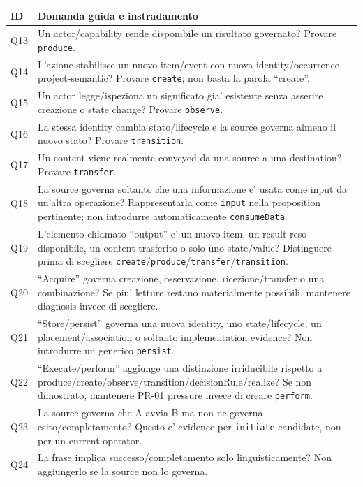\documentclass[11pt,a4paper]{article}
\begin{document}
\begin{longtable}{L{17mm}L{122mm}}
\toprule
\textbf{ID} & \textbf{Domanda guida e instradamento} \\
\midrule\endhead
Q13 & Un actor/capability rende disponibile un risultato governato? Provare \texttt{produce}. \\
Q14 & L'azione stabilisce un nuovo item/event con nuova identity/occurrence project-semantic? Provare \texttt{create}; non basta la parola ``create''. \\
Q15 & Un actor legge/ispeziona un significato gia' esistente senza asserire creazione o state change? Provare \texttt{observe}. \\
Q16 & La stessa identity cambia stato/lifecycle e la source governa almeno il nuovo stato? Provare \texttt{transition}. \\
Q17 & Un content viene realmente conveyed da una source a una destination? Provare \texttt{transfer}. \\
Q18 & La source governa soltanto che una informazione e' usata come input da un'altra operazione? Rappresentarla come \texttt{input} nella proposition pertinente; non introdurre automaticamente \texttt{consumeData}. \\
Q19 & L'elemento chiamato ``output'' e' un nuovo item, un result reso disponibile, un content trasferito o solo uno state/value? Distinguere prima di scegliere \texttt{create}/\texttt{produce}/\texttt{transfer}/\texttt{transition}. \\
Q20 & ``Acquire'' governa creazione, osservazione, ricezione/transfer o una combinazione? Se piu' letture restano materialmente possibili, mantenere diagnosis invece di scegliere. \\
Q21 & ``Store/persist'' governa una nuova identity, uno state/lifecycle, un placement/association o soltanto implementation evidence? Non introdurre un generico \texttt{persist}. \\
Q22 & ``Execute/perform'' aggiunge una distinzione irriducibile rispetto a produce/create/observe/transition/decisionRule/realize? Se non dimostrato, mantenere PR-01 pressure invece di creare \texttt{perform}. \\
Q23 & La source governa che A avvia B ma non ne governa esito/completamento? Questo e' evidence per \texttt{initiate} candidate, non per un current operator. \\
Q24 & La frase implica successo/completamento solo linguisticamente? Non aggiungerlo se la source non lo governa. \\
\bottomrule
\end{longtable}
\end{document}
